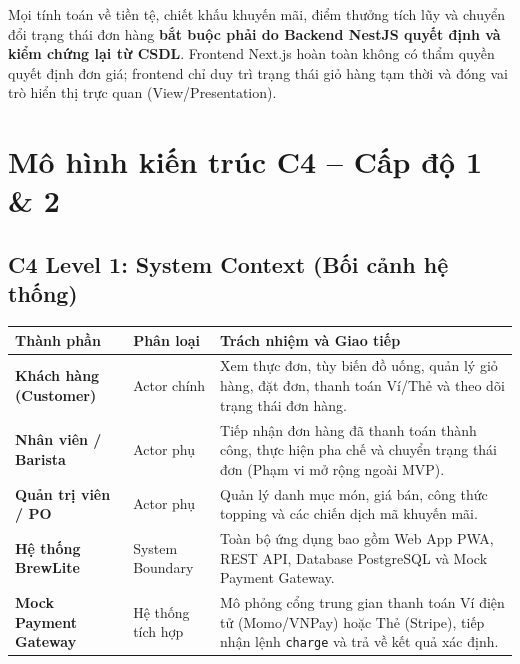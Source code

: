 \documentclass[11pt, a4paper]{article}
\begin{document}
\begin{calloutbox}
	Mọi tính toán về tiền tệ, chiết khấu khuyến mãi, điểm thưởng tích lũy và chuyển đổi trạng thái đơn hàng \textbf{bắt buộc phải do Backend NestJS quyết định và kiểm chứng lại từ CSDL}. Frontend Next.js hoàn toàn không có thẩm quyền quyết định đơn giá; frontend chỉ duy trì trạng thái giỏ hàng tạm thời và đóng vai trò hiển thị trực quan (View/Presentation).
\end{calloutbox}

\section{Mô hình kiến trúc C4 -- Cấp độ 1 \& 2}

\subsection{C4 Level 1: System Context (Bối cảnh hệ thống)}

\begin{table}[h!]
	\small
	\centering
	\begin{tabular}{p{3.2cm} p{2.8cm} p{8.5cm}}
		\toprule
		\rowcolor{tableheader}
		\textbf{Thành phần}            & \textbf{Phân loại} & \textbf{Trách nhiệm và Giao tiếp}                                                                                                         \\
		\midrule
		\textbf{Khách hàng (Customer)} & Actor chính        & Xem thực đơn, tùy biến đồ uống, quản lý giỏ hàng, đặt đơn, thanh toán Ví/Thẻ và theo dõi trạng thái đơn hàng.                             \\
		\textbf{Nhân viên / Barista}   & Actor phụ          & Tiếp nhận đơn hàng đã thanh toán thành công, thực hiện pha chế và chuyển trạng thái đơn (Phạm vi mở rộng ngoài MVP).                      \\
		\textbf{Quản trị viên / PO}    & Actor phụ          & Quản lý danh mục món, giá bán, công thức topping và các chiến dịch mã khuyến mãi.                                                         \\
		\textbf{Hệ thống BrewLite}     & System Boundary    & Toàn bộ ứng dụng bao gồm Web App PWA, REST API, Database PostgreSQL và Mock Payment Gateway.                                              \\
		\textbf{Mock Payment Gateway}  & Hệ thống tích hợp  & Mô phỏng cổng trung gian thanh toán Ví điện tử (Momo/VNPay) hoặc Thẻ (Stripe), tiếp nhận lệnh \texttt{charge} và trả về kết quả xác định. \\
		\bottomrule
	\end{tabular}
\end{table}
\end{document}
